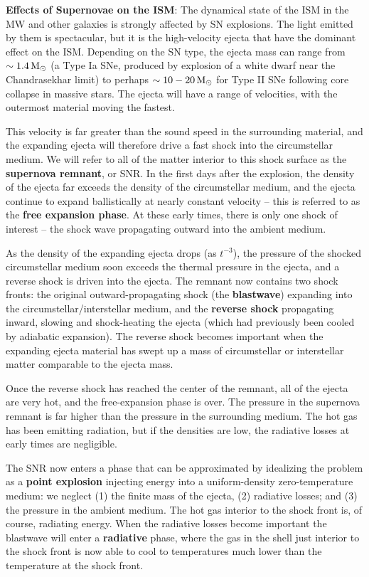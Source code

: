 \documentclass[a4paper,10pt]{article}
\begin{document}
{\noindent}\textbf{Effects of Supernovae on the ISM}: The dynamical state of the ISM in the MW and other galaxies is strongly affected by SN explosions. The light emitted by them is spectacular, but it is the high-velocity ejecta that have the dominant effect on the ISM. Depending on the SN type, the ejecta mass can range from $\sim1.4\,{\rm M_\odot}$ (a Type Ia SNe, produced by explosion of a white dwarf near the Chandrasekhar limit) to perhaps $\sim10-20\,{\rm M_\odot}$ for Type II SNe following core collapse in massive stars. The ejecta will have a range of velocities, with the outermost material moving the fastest. 

{\noindent}This velocity is far greater than the sound speed in the surrounding material, and the expanding ejecta will therefore drive a fast shock into the circumstellar medium. We will refer to all of the matter interior to this shock surface as the \textbf{supernova remnant}, or SNR. In the first days after the explosion, the density of the ejecta far exceeds the density of the circumstellar medium, and the ejecta continue to expand ballistically at nearly constant velocity -- this is referred to as the \textbf{free expansion phase}. At these early times, there is only one shock of interest -- the shock wave propagating outward into the ambient medium.

{\noindent}As the density of the expanding ejecta drops (as $t^{-3}$), the pressure of the shocked circumstellar medium soon exceeds the thermal pressure in the ejecta, and a reverse shock is driven into the ejecta. The remnant now contains two shock fronts: the original outward-propagating shock (the \textbf{blastwave}) expanding into the circumstellar/interstellar medium, and the \textbf{reverse shock} propagating inward, slowing and shock-heating the ejecta (which had previously been cooled by adiabatic expansion). The reverse shock becomes important when the expanding ejecta material has swept up a mass of circumstellar or interstellar matter comparable to the ejecta mass.

{\noindent}Once the reverse shock has reached the center of the remnant, all of the ejecta are very hot, and the free-expansion phase is over. The pressure in the supernova remnant is far higher than the pressure in the surrounding medium. The hot gas has been emitting radiation, but if the densities are low, the radiative losses at early times are negligible.

{\noindent}The SNR now enters a phase that can be approximated by idealizing the problem as a \textbf{point explosion} injecting energy into a uniform-density zero-temperature medium: we neglect (1) the finite mass of the ejecta, (2) radiative losses; and (3) the pressure in the ambient medium. The hot gas interior to the shock front is, of course, radiating energy. When the radiative losses become important the blastwave will enter a \textbf{radiative} phase, where the gas in the shell just interior to the shock front is now able to cool to temperatures much lower than the temperature at the shock front.
\end{document}
